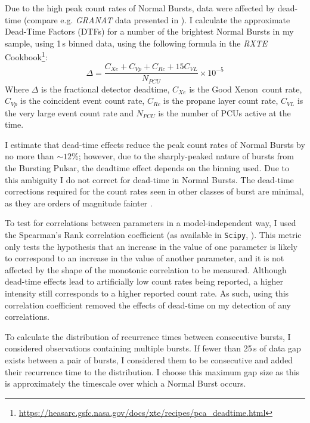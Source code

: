 \par Due to the high peak count rates of Normal Bursts, data were affected by dead-time (compare e.g. \textit{GRANAT} data presented in \citealp{Sazonov_BPGranat}).  I calculate the approximate Dead-Time Factors (DTFs) for a number of the brightest Normal Bursts in my sample, using 1\,s binned data, using the following formula in the \indexrxte\textit{RXTE} Cookbook\footnote{\url{https://heasarc.gsfc.nasa.gov/docs/xte/recipes/pca_deadtime.html}}:
\begin{equation}
\Delta=\frac{C_{Xe}+C_{Vp}+C_{Rc}+15C_{VL}}{N_{PCU}}\times10^{-5}
\end{equation}
Where $\Delta$ is the fractional detector deadtime, $C_{Xe}$ is the Good Xenon\indexgx\ count rate, $C_{Vp}$ is the coincident event count rate, $C_{Rc}$ is the propane layer count rate, $C_{VL}$ is the very large event count rate and $N_{PCU}$ is the number of PCUs active at the time.
\par I estimate that dead-time effects reduce the peak count rates of Normal Bursts by no more than $\sim12$\%; however, due to the sharply-peaked nature of bursts from the Bursting Pulsar, the deadtime effect depends on the binning used.  Due to this ambiguity I do not correct for dead-time in Normal Bursts.  The dead-time corrections required for the count rates seen in other classes of burst are minimal, as they are orders of magnitude fainter \citep{Giles_BP}.
\par To test for correlations between parameters in a model-independent way, I used the Spearman's Rank correlation coefficient (as available in \texttt{Scipy}, \citealp{NumPy}).  This metric only tests the hypothesis that an increase in the value of one parameter is likely to correspond to an increase in the value of another parameter, and it is not affected by the shape of the monotonic correlation to be measured.  Although dead-time effects lead to artificially low count rates being reported, a higher intensity still corresponds to a higher reported count rate.   As such, using this correlation coefficient removed the effects of dead-time on my detection of any correlations.
\par To calculate the distribution of recurrence times between consecutive bursts, I considered observations containing multiple bursts.  If fewer than 25\,s of data gap exists between a pair of bursts, I considered them to be consecutive and added their recurrence time to the distribution.  I choose this maximum gap size as this is approximately the timescale over which a Normal Burst occurs.
